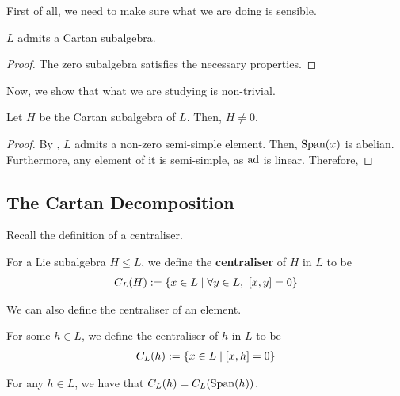 First of all, we need to make sure what we are doing is sensible.

\begin{lemma}
    $L$ admits a Cartan subalgebra.
\end{lemma}
\begin{proof}
    The zero subalgebra satisfies the necessary properties. %
\end{proof}

Now, we show that what we are studying is non-trivial.

\begin{boxproposition}
    Let $H$ be the Cartan subalgebra of $L$. Then, $H \neq 0$.
\end{boxproposition}
\begin{proof}
    By , $L$ admits a non-zero semi-simple element. Then, $\operatorname{Span}\!\left( x \right)$ is abelian. Furthermore, any element of it is semi-simple, as $\operatorname{ad}$ is linear. Therefore, \sorry
\end{proof}

\subsection{The Cartan Decomposition}

Recall the definition of a centraliser. %

\begin{boxdefinition}
    For a Lie subalgebra $H \leq L$, we define the \textbf{centraliser} of $H$ in $L$ to be
    \begin{align*}
        C_L(H) := \left\{ x \in L \; \middle\vert \; \forall y \in L, \ \left[ x, y \right] = 0 \right\}
    \end{align*}
\end{boxdefinition}

We can also define the centraliser of an element.

\begin{boxdefinition}
    For some $h \in L$, we define the centraliser of $h$ in $L$ to be
    \begin{align*}
        C_L(h) := \left\{ x \in L \; \middle\vert \; \left[ x, h \right] = 0 \right\}
    \end{align*}
\end{boxdefinition}


\begin{lemma}
    For any $h \in L$, we have that $C_L(h) = C_L\!\left( \operatorname{Span}\!\left( h \right) \right)$.
\end{lemma}


